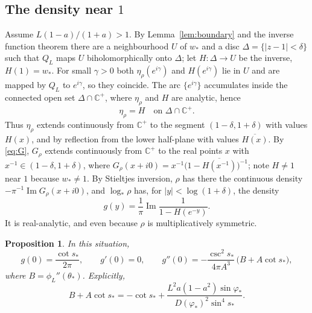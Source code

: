 \documentclass[11pt]{amsart}
\newtheorem{proposition}[theorem]{Proposition}
\theoremstyle{remark}
\newcommand{\C}{\mathbb C}
\newcommand{\CH}{\C^{+}}
\begin{document}
\subsection{The density near \texorpdfstring{$1$}{1}}
Assume $L(1-a)/(1+a)>1$. By Lemma~\ref{lem:boundary} and the inverse function theorem there are a neighbourhood $U$ of $w_*$ and a disc $\Delta=\{|z-1|<\delta\}$ such that $Q_L$ maps $U$ biholomorphically onto $\Delta$; let $H:\Delta\to U$ be the inverse, $H(1)=w_*$. For small $\gamma>0$ both $\eta_\rho(e^{i\gamma})$ and $H(e^{i\gamma})$ lie in $U$ and are mapped by $Q_L$ to $e^{i\gamma}$, so they coincide. The arc $\{e^{i\gamma}\}$ accumulates inside the connected open set $\Delta\cap\CH$, where $\eta_\rho$ and $H$ are analytic, hence
\begin{equation}\label{eq:etaH2}
\eta_\rho=H\quad\text{on }\Delta\cap\CH .
\end{equation}
Thus $\eta_\rho$ extends continuously from $\CH$ to the segment $(1-\delta,1+\delta)$ with values $H(x)$, and by reflection from the lower half-plane with values $\overline{H(x)}$. By \eqref{eq:G}, $G_\rho$ extends continuously from $\CH$ to the real points $x$ with $x^{-1}\in(1-\delta,1+\delta)$, where $G_\rho(x+i0)=x^{-1}\bigl(1-\overline{H(x^{-1})}\bigr)^{-1}$; note $H\ne1$ near $1$ because $w_*\ne1$. By Stieltjes inversion, $\rho$ has there the continuous density $-\pi^{-1}\operatorname{Im}G_\rho(x+i0)$, and $\log_*\rho$ has, for $|y|<\log(1+\delta)$, the density
\begin{equation}\label{eq:g}
g(y)=\frac1\pi\operatorname{Im}\frac1{1-H(e^{-y})}.
\end{equation}
It is real-analytic, and even because $\rho$ is multiplicatively symmetric.

\begin{proposition}\label{prop:g}
In this situation,
\[
g(0)=\frac{\cot s_*}{2\pi},\qquad g'(0)=0,\qquad g''(0)=-\frac{\csc^2s_*}{4\pi A^3}\,\bigl(B+A\cot s_*\bigr),
\]
where $B=\phi_L''(\theta_*)$. Explicitly,
\begin{equation}\label{eq:B}
B+A\cot s_*=-\cot s_*+\frac{L^2a(1-a^2)\sin\varphi_*}{D(\varphi_*)^2\sin^4s_*}.
\end{equation}
\end{proposition}
\end{document}
